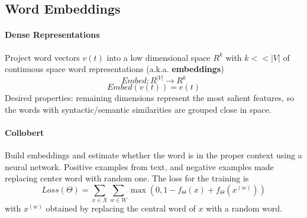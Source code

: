 \documentclass[10pt]{report}
\begin{document}
\subsection{Word Embeddings}
\paragraph{Dense Representations} Project word vectors $v(t)$ into a low dimensional space $R^k$ with $k<<|V|$ of continuous space word representations (a.k.a. \textbf{embeddings})
$$Embed : R^{|V|}\rightarrow R^k$$
$$Embed(v(t)) = e(t)$$
Desired properties: remaining dimensions represent the most salient features, so the words with syntactic/semantic similarities are grouped close in space.
\paragraph{Collobert} Build embeddings and estimate whether the word is in the proper context using a neural network. Positive examples from text, and negative examples made replacing center word with random one. The loss for the training is $$Loss(\Theta) = \sum_{x\in X}\sum_{w\in W} \max(0, 1-f_\Theta(x) + f_\Theta(x^{(w)}))$$
with $x^{(w)}$ obtained by replacing the central word of $x$ with a random word.
\end{document}
